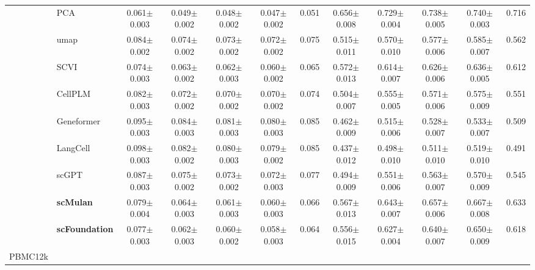 \begin{table}[htbp]
\begin{tabular}{cl|ccccc|ccccc}
    & PCA      & \cellcolor{gray!25}0.061$\pm$0.003 & \cellcolor{gray!25}0.049$\pm$0.002 & \cellcolor{gray!25}0.048$\pm$0.002 & \cellcolor{gray!25}0.047$\pm$0.002 & \cellcolor{gray!25}0.051      & \cellcolor{gray!25}0.656$\pm$0.008 & \cellcolor{gray!25}0.729$\pm$0.004 & \cellcolor{gray!25}0.738$\pm$0.005 & \cellcolor{gray!25}0.740$\pm$0.003 & \cellcolor{gray!25}0.716 \\
    & umap      & 0.084$\pm$0.002 & 0.074$\pm$0.002 & 0.073$\pm$0.002 & 0.072$\pm$0.002 & 0.075      & 0.515$\pm$0.011 & 0.570$\pm$0.010 & 0.577$\pm$0.006 & 0.585$\pm$0.007 & 0.562 \\
    & SCVI      & 0.074$\pm$0.003 & 0.063$\pm$0.002 & 0.062$\pm$0.003 & 0.060$\pm$0.002 & 0.065      & 0.572$\pm$0.013 & 0.614$\pm$0.007 & 0.626$\pm$0.006 & 0.636$\pm$0.005 & 0.612 \\
    & CellPLM      & 0.082$\pm$0.003 & 0.072$\pm$0.002 & 0.070$\pm$0.002 & 0.070$\pm$0.002 & 0.074      & 0.504$\pm$0.007 & 0.555$\pm$0.005 & 0.571$\pm$0.006 & 0.575$\pm$0.009 & 0.551 \\
    & Geneformer      & 0.095$\pm$0.003 & 0.084$\pm$0.003 & 0.081$\pm$0.003 & 0.080$\pm$0.003 & 0.085      & 0.462$\pm$0.009 & 0.515$\pm$0.006 & 0.528$\pm$0.007 & 0.533$\pm$0.007 & 0.509 \\
    & LangCell      & 0.098$\pm$0.003 & 0.082$\pm$0.002 & 0.080$\pm$0.003 & 0.079$\pm$0.002 & 0.085      & 0.437$\pm$0.012 & 0.498$\pm$0.010 & 0.511$\pm$0.010 & 0.519$\pm$0.010 & 0.491 \\
    & scGPT      & 0.087$\pm$0.003 & 0.075$\pm$0.002 & 0.073$\pm$0.002 & 0.072$\pm$0.003 & 0.077      & 0.494$\pm$0.009 & 0.551$\pm$0.006 & 0.563$\pm$0.007 & 0.570$\pm$0.009 & 0.545 \\
    & \cellcolor{gray!25}\textbf{scMulan}      & 0.079$\pm$0.004 & 0.064$\pm$0.003 & 0.061$\pm$0.003 & 0.060$\pm$0.003 & 0.066      & 0.567$\pm$0.013 & 0.643$\pm$0.007 & 0.657$\pm$0.006 & 0.667$\pm$0.008 & 0.633 \\
    & \cellcolor{gray!25}\textbf{scFoundation}      & 0.077$\pm$0.003 & 0.062$\pm$0.003 & 0.060$\pm$0.002 & 0.058$\pm$0.003 & 0.064      & 0.556$\pm$0.015 & 0.627$\pm$0.004 & 0.640$\pm$0.007 & 0.650$\pm$0.009 & 0.618 \\
    \midrule

    \multirow{9}{*}{PBMC12k}


\end{tabular}
\end{table}
